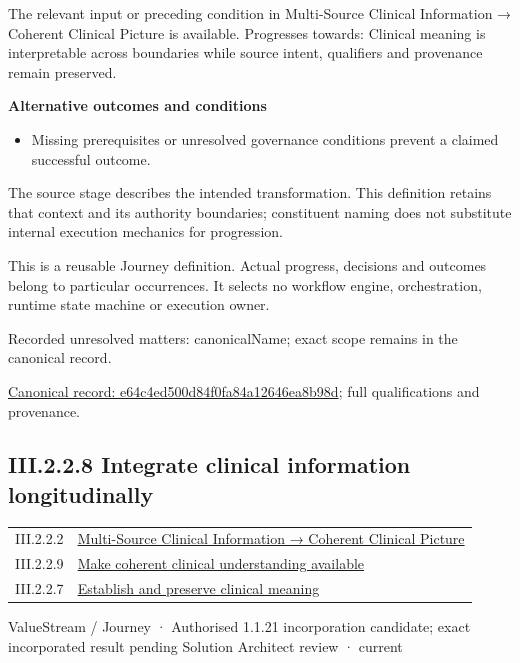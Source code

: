 The relevant input or preceding condition in Multi-Source Clinical Information → Coherent Clinical Picture is available. Progresses towards: Clinical meaning is interpretable across boundaries while source intent, qualifiers and provenance remain preserved.



\par\medskip\textbf{Alternative outcomes and conditions}\par


\begin{itemize}


\item Missing prerequisites or unresolved governance conditions prevent a claimed successful outcome.

\end{itemize}


The source stage describes the intended transformation. This definition retains that context and its authority boundaries; constituent naming does not substitute internal execution mechanics for progression.



This is a reusable Journey definition. Actual progress, decisions and outcomes belong to particular occurrences. It selects no workflow engine, orchestration, runtime state machine or execution owner.


{\small Recorded unresolved matters: canonicalName; exact scope remains in the canonical record.}\par
{\footnotesize \href{../../../../continuum/strategy/value-stream/e64c4ed500d84f0fa84a12646ea8b98d.md}{Canonical record: e64c4ed500d84f0fa84a12646ea8b98d}; full qualifications and provenance.}\par
\subsection*{III.2.2.8 Integrate clinical information longitudinally}
\label{navigation:III.2.2.8}

\begin{longtable}{p{.22\linewidth}p{.73\linewidth}}
III.2.2.2 & \hyperref[element:01f655eae3d8485699449c3dcf4f9b56]{Multi-Source Clinical Information → Coherent Clinical Picture} \\
III.2.2.9 & \hyperref[element:75179fdde77f4c94a47756a7ae109b34]{Make coherent clinical understanding available} \\
III.2.2.7 & \hyperref[element:e64c4ed500d84f0fa84a12646ea8b98d]{Establish and preserve clinical meaning} \\
\end{longtable}
\label{element:80b2d41cb7fc4c929cee667353caa411}
{\small ValueStream / Journey · Authorised 1.1.21 incorporation candidate; exact incorporated result pending Solution Architect review · current}\par

